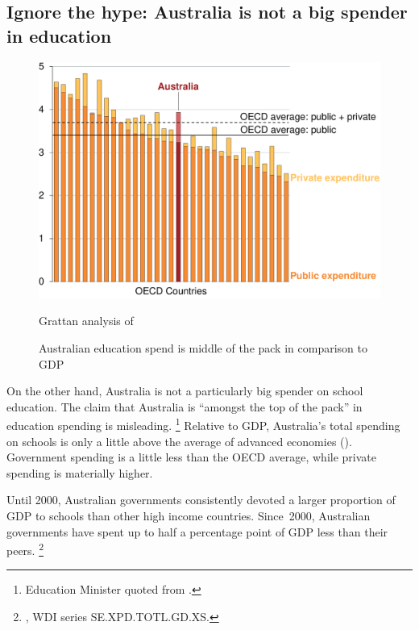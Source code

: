 \documentclass{grattan}
\begin{document}
\subsection{Ignore the hype: Australia is not a big spender in education }\label{subsec:ignore-the-hype-australia-is-not-a-big-spender-in-education}
\begin{figure}
\caption{Australian education spend is middle of the pack in comparison to GDP\label{fig:Aust-edu-spend-is-middle-of-pack}}

\includegraphics[page=1]{atlas/Charts.pdf}

%
{Grattan analysis of \textcite[][207]{OECD2016EducationGlance2016}}
\end{figure}

On the other hand, Australia is not a particularly big spender on school education.
The claim that Australia is ``amongst the top of the pack'' in education spending is misleading.%
\footnote{Education Minister quoted from \textcite{Conifer2016GlobalEducationReport}.}
Relative to GDP, Australia's total spending on schools is only a little above the average of advanced economies ().
Government spending is a little less than the OECD average, while private spending is materially higher.

Until 2000, Australian governments consistently devoted a larger proportion of GDP to schools than other high income countries.
Since~2000, Australian governments have spent up to half a percentage point of GDP less than their peers.%
\footnote{\textcite{WorldBank2016WordDevelopmentIndicators}, WDI series SE.XPD.TOTL.GD.XS.}
\end{document}
